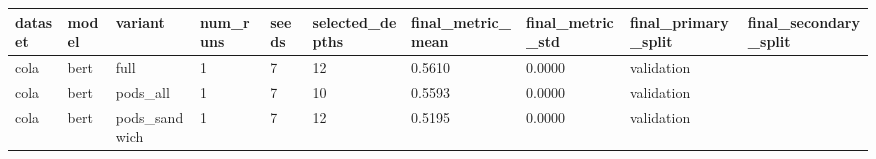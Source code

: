 \begin{tabular}{llllllllll}
\hline
dataset & model & variant & num\_runs & seeds & selected\_depths & final\_metric\_mean & final\_metric\_std & final\_primary\_split & final\_secondary\_split \\
\hline
cola & bert & full & 1 & 7 & 12 & 0.5610 & 0.0000 & validation &  \\
cola & bert & pods\_all & 1 & 7 & 10 & 0.5593 & 0.0000 & validation &  \\
cola & bert & pods\_sandwich & 1 & 7 & 12 & 0.5195 & 0.0000 & validation &  \\
\hline
\end{tabular}
